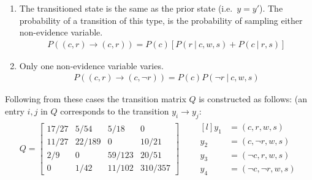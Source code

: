 \documentclass[a4paper, 12pt, one column, aas_macros]{article}
\newcommand\given[1][]{\:#1\vert\:}
\begin{document}
\begin{enumerate}[label=\alph*]
\begin{enumerate}
        \item The transitioned state is the same as the prior state (i.e.\ $y = y'$). The probability of a transition of this type, is the probability of sampling either non-evidence variable. \begin{align*}
        	P((c, r) \rightarrow (c, r)) = P(c)[P(r\given c, w, s) + P(c\given r, s)]
        	\end{align*}
        \item
        	Only one non-evidence variable varies.
            \begin{align*}
        	P((c, r) \rightarrow (c, \neg r)) = P(c)P(\neg r\given c, w, s)
        	\end{align*}
        \end{enumerate}
        Following from these cases the transition matrix $Q$ is constructed as follows: (an entry $i,j$ in $Q$ corresponds to the transition $y_{i} \rightarrow y_{j}$:
        \begin{align*}
        	Q = \begin{bmatrix}
        	17/27 & 5/54 & 5/18 & 0 \\
            11/27 & 22/189 & 0 & 10/21 \\
            2/9 & 0 & 59/123 & 20/51 \\
            0 & 1/42 & 11/102 & 310/357
        	\end{bmatrix} \qquad \begin{matrix*}[l]
        	y_{1} &= (c, r, w, s) \\
            y_{2} &= (c, \neg r, w, s) \\
            y_{3} &= (\neg c, r, w, s) \\ 
            y_{4} &= (\neg c, \neg r, w, s)
        	\end{matrix*}
        \end{align*}
    \end{enumerate}
\end{document}
